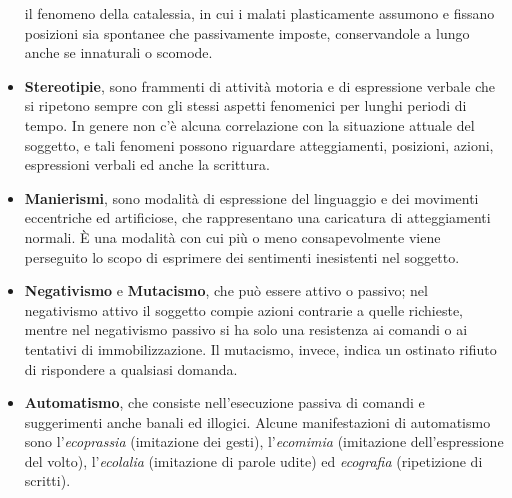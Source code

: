 \begin{itemize}
  il fenomeno della catalessia, in cui i malati plasticamente assumono e
  fissano posizioni sia spontanee che passivamente imposte,
  conservandole a lungo anche se innaturali o scomode.
\item
  \textbf{Stereotipie}, sono frammenti di attività motoria e di
  espressione verbale che si ripetono sempre con gli stessi aspetti
  fenomenici per lunghi periodi di tempo. In genere non c'è alcuna
  correlazione con la situazione attuale del soggetto, e tali fenomeni
  possono riguardare atteggiamenti, posizioni, azioni, espressioni
  verbali ed anche la scrittura.
\item
  \textbf{Manierismi}, sono modalità di espressione del linguaggio e dei
  movimenti eccentriche ed artificiose, che rappresentano una caricatura
  di atteggiamenti normali. È una modalità con cui più o meno
  consapevolmente viene perseguito lo scopo di esprimere dei sentimenti
  inesistenti nel soggetto.
\item
  \textbf{Negativismo} e \textbf{Mutacismo}, che può essere attivo o
  passivo; nel negativismo attivo il soggetto compie azioni contrarie a
  quelle richieste, mentre nel negativismo passivo si ha solo una
  resistenza ai comandi o ai tentativi di immobilizzazione. Il
  mutacismo, invece, indica un ostinato rifiuto di rispondere a
  qualsiasi domanda.
\item
  \textbf{Automatismo}, che consiste nell'esecuzione passiva di comandi
  e suggerimenti anche banali ed illogici. Alcune manifestazioni di
  automatismo sono l'\emph{ecoprassia} (imitazione dei gesti),
  l'\emph{ecomimia} (imitazione dell'espressione del volto),
  l'\emph{ecolalia} (imitazione di parole udite) ed \emph{ecografia}
  (ripetizione di scritti).
\end{itemize}
